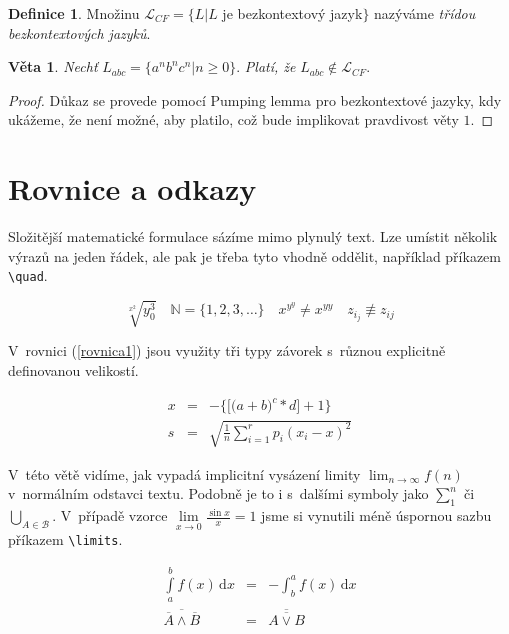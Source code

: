 \documentclass[11pt,a4paper,titlepage,twocolumn]{article}
\theoremstyle{definition}
\newtheorem{defi}{Definice}[section]
\newtheorem{veta}{Věta}
\begin{document}
		\begin{defi}
			Množinu $\mathcal{L}_{CF}=\{L|L$ je bezkontextový jazyk$\}$ nazýváme \emph{třídou bezkontextových jazyků}.
		\end{defi}

		\begin{veta}
			\emph{Nechť} $L_{abc}=\{a^nb^nc^n|n \geq 0\}$. \emph{Platí, že} $L_{abc} \not \in \mathcal{L}_{CF}$.
		\end{veta}

		\begin{proof} 
			Důkaz se provede pomocí Pumping lemma pro bezkontextové jazyky, kdy ukážeme, 
			že není možné, aby platilo, což bude implikovat pravdivost věty $1$.
		\end{proof}

\section{Rovnice a odkazy}

	Složitější matematické formulace sázíme mimo plynulý text. Lze umístit několik výrazů na jeden řádek, 
	ale pak je třeba tyto vhodně oddělit, například příkazem \verb|\quad|.

	$$\sqrt[x^2]{y_0^3} \quad \mathbb{N}=\{1,2,3,\ldots\} \quad x^{y^{y}} \neq x^{yy}  \quad z_{i_{j}} \not \equiv z_{ij}$$


	V~rovnici (\ref{rovnica1}) jsou využity tři typy závorek s~různou explicitně definovanou velikostí.
	
	\begin{eqnarray} \label{rovnica1}
		x & = & -\bigg\{ \Big[ \big( a+b \big)^{c}*d \Big] +1 \bigg\} \\ 
	 	\nonumber s & = & \sqrt{\frac{1}{n} \sum_{i=1}^r p_i(x_i-x)^2}
	\end{eqnarray}

	V~této větě vidíme, jak vypadá implicitní vysázení limity $\lim_{n \rightarrow \infty} f(n)$
	v~normálním odstavci textu. Podobně je to i s~dalšími symboly jako $\sum_{1}^n$ či 
	$\bigcup_{A \in \mathcal{B}}$. V~případě vzorce $\lim\limits_{x \rightarrow 0} \frac{\sin{x}}{x} = 1$ 
	jsme si vynutili méně úspornou sazbu příkazem \verb|\limits|.

	\begin{eqnarray}
		\int\limits _a^b f(x)\,\mathrm{d}x &= &-\int_b^a f(x)\,\mathrm{d}x\\
		\overline{\overline{A} \wedge \overline{B}} & = & \overline{\overline{A \vee B}}
	\end{eqnarray}
\end{document}
